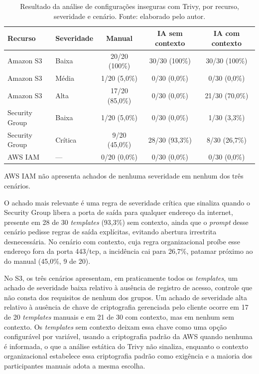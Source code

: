 \begin{table}[H]
\centering
\caption{Resultado da análise de configurações inseguras com Trivy, por recurso, severidade e cenário. Fonte: elaborado pelo autor.}
\label{tab:trivy}
\begin{tabular}{l|l|c|c|c}
\hline
\textbf{Recurso} & \textbf{Severidade} & \textbf{Manual} & \textbf{IA sem contexto} & \textbf{IA com contexto} \\
\hline
Amazon S3 & Baixa & 20/20 (100\%) & 30/30 (100\%) & 30/30 (100\%) \\
Amazon S3 & Média & 1/20 (5,0\%) & 0/30 (0,0\%) & 0/30 (0,0\%) \\
Amazon S3 & Alta & 17/20 (85,0\%) & 0/30 (0,0\%) & 21/30 (70,0\%) \\
\hline
Security Group & Baixa & 1/20 (5,0\%) & 0/30 (0,0\%) & 1/30 (3,3\%) \\
Security Group & Crítica & 9/20 (45,0\%) & 28/30 (93,3\%) & 8/30 (26,7\%) \\
\hline
AWS IAM & --- & 0/20 (0,0\%) & 0/30 (0,0\%) & 0/30 (0,0\%) \\
\hline
\end{tabular}
\vspace{2pt}
\footnotesize{AWS IAM não apresenta achados de nenhuma severidade em nenhum dos três cenários.}
\end{table}

O achado mais relevante é uma regra de severidade crítica que sinaliza quando o Security Group libera a porta de saída para qualquer endereço da internet, presente em 28 de 30 \textit{templates} (93,3\%) sem contexto, ainda que o \textit{prompt} desse cenário pedisse regras de saída explícitas, evitando abertura irrestrita desnecessária. No cenário com contexto, cuja regra organizacional proíbe esse endereço fora da porta 443/tcp, a incidência cai para 26,7\%, patamar próximo ao do manual (45,0\%, 9 de 20).

No S3, os três cenários apresentam, em praticamente todos os \textit{templates}, um achado de severidade baixa relativo à ausência de registro de acesso, controle que não consta dos requisitos de nenhum dos grupos. Um achado de severidade alta relativo à ausência de chave de criptografia gerenciada pelo cliente ocorre em 17 de 20 \textit{templates} manuais e em 21 de 30 com contexto, mas em nenhum sem contexto. Os \textit{templates} sem contexto deixam essa chave como uma opção configurável por variável, usando a criptografia padrão da AWS quando nenhuma é informada, o que a análise estática do Trivy não sinaliza, enquanto o contexto organizacional estabelece essa criptografia padrão como exigência e a maioria dos participantes manuais adota a mesma escolha.

